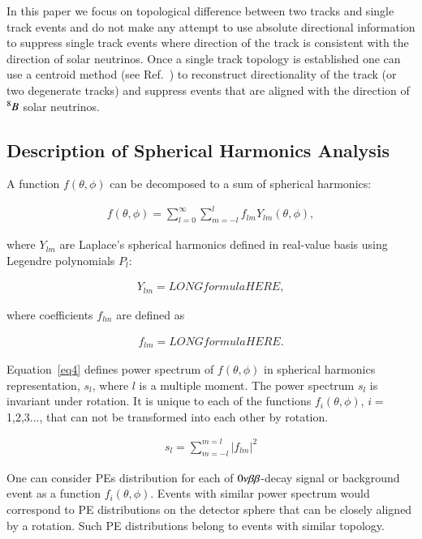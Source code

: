 In this paper we focus on topological difference between two tracks and single track events and do not make any attempt to use absolute directional information to suppress single track events  where direction of the track is consistent with the direction of solar neutrinos. Once a single track topology is established one can use a centroid method (see Ref.~\cite{Directionality}) to reconstruct directionality of the track (or two degenerate tracks) and suppress events that are aligned with the direction of $^{8}B$ solar neutrinos.

\subsection{Description of Spherical Harmonics Analysis}
A function $f(\theta,\phi)$ can be decomposed to a sum of spherical harmonics:

\begin{eqnarray}
\label{eq1}
f(\theta,\phi) = \sum_{l=0}^{\infty} \sum_{m=-l}^{l} f_{lm} Y_{lm}(\theta,\phi),
\end{eqnarray}

where $Y_{lm}$ are Laplace's spherical harmonics defined in real-value basis using Legendre polynomials $P_l$:

\begin{eqnarray}
\label{eq2}
Y_{lm} = LONGformulaHERE,
\end{eqnarray}

 where  coefficients $f_{lm}$ are defined as
 
\begin{eqnarray}
\label{eq3}
f_{lm} = LONGformulaHERE.
\end{eqnarray}

Equation~\ref{eq4} defines power spectrum of $f(\theta,\phi)$ in spherical harmonics representation, $s_l$, where $l$ is a multiple moment. The power spectrum $s_l$ is invariant under rotation. It is unique to each of the functions $f_i(\theta,\phi)$, $i=$1,2,3..., that can not be transformed into each other by rotation.

\begin{eqnarray}
\label{eq4}
s_l = \sum_{m=-l}^{m=l} |f_{lm}|^2
\end{eqnarray}

One can consider PEs distribution for each of $0\nu\beta\beta$-decay signal or background event as a function $f_i(\theta,\phi)$. Events with similar power spectrum would correspond to PE distributions on the detector sphere that can be closely aligned by a rotation. Such PE distributions belong to events with similar topology.

